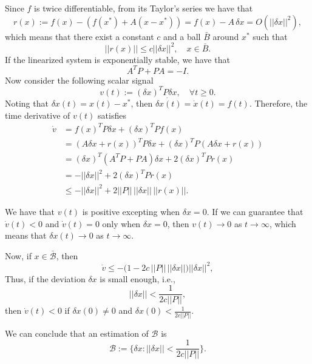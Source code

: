 \documentclass[11pt,a4paper,titlepage]{article}
\begin{document}
Since $f$ is twice differentiable, from its Taylor's series we have that
\begin{equation}
	r(x) := f(x) - (f(x^*) + A(x - x^*)) = f(x) - A\,\delta x = O(||\delta x||^2),
\end{equation}
which means that there exist a constant $c$ and a ball $\bar B$ around $x^*$ such that
\begin{equation}
	||r(x)|| \leq c||\delta x||^2, \quad x\in\bar B.
\end{equation}
If the linearized system is exponentially stable, we have that
\begin{equation}
A^TP + PA = -I.
\end{equation}
Now consider the following scalar signal
\begin{equation}
	v(t) := (\delta x)^T P \delta x, \quad \forall t\geq 0.
\end{equation}
Noting that $\delta x(t) = x(t) - x^*$, then $\dot{\delta x(t)} = \dot x(t) = f(t)$. Therefore, the time derivative of $v(t)$ satisfies
\begin{align}
	\dot v &= f(x)^T P \delta x + (\delta x)^T P f(x) \nonumber \\
	&= (A\delta x + r(x))^T P \delta x + (\delta x)^T P (A\delta x + r(x)) \nonumber \\
	&= (\delta x)^T(A^T P + PA)\delta x + 2(\delta x)^T P r(x) \nonumber \\
	&= -||\delta x||^2 + 2(\delta x)^T P r(x) \nonumber \\
	&\leq -||\delta x||^2 + 2 ||P||\, ||\delta x|| \, ||r(x)||.
\end{align}

We have that $v(t)$ is positive excepting when $\delta x = 0$. If we can guarantee that $\dot v(t) < 0$ and $\dot v(t) = 0$ only when $\delta x = 0$, then $v(t) \to 0$ as $t\to\infty$, which means that $\delta x(t) \to 0$ as $t\to\infty$.

Now, if $x\in\mathcal{\bar B}$, then
\begin{equation}
	\dot v \leq -\Big(1 - 2c\,||P||\,||\delta x||\Big)||\delta x||^2,
\end{equation}
Thus, if the deviation $\delta x$ is small enough, i.e.,
\begin{equation}
||\delta x|| < \frac{1}{2c||P||},
\end{equation}
then $\dot v(t) < 0$ if $\delta x(0) \neq 0$ and $\delta x(0) < \frac{1}{2c||P||}$.

We can conclude that an estimation of $\mathcal B$ is
\begin{equation}
	\mathcal{B} := \{ \delta x : ||\delta x|| < \frac{1}{2c||P||} \}.
	\label{eq: Bregion}
\end{equation}
\end{document}
